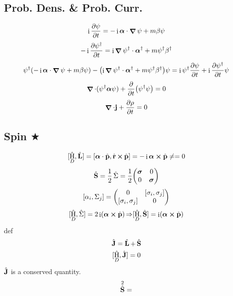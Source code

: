 \documentclass[a4paper]{article}
\DeclareMathOperator{\I}{\mathrm{i}}
\DeclareMathOperator{\dra}{\Rightarrow}
\DeclareMathOperator{\na}{\bm{\nabla}}
\DeclareMathOperator{\hr}{\hat{\vb{r}}}
\DeclareMathOperator{\hH}{\hat{H}}
\DeclareMathOperator{\hL}{\hat{\vb{L}}}
\DeclareMathOperator{\hp}{\hat{\vb{p}}}
\DeclareMathOperator{\hS}{\hat{\vb{S}}}
\DeclareMathOperator{\hSigma}{\hat{\bm\Sigma}}
\DeclareMathOperator{\hJ}{\hat{\vb{J}}}
\numberwithin{equation}{section}
\begin{document}
\subsection{Prob. Dens. \& Prob. Curr.}
\begin{equation}\label{key}
\I\pdv{\psi}{t} = -\I\bm\alpha\cdot\na \psi + m\beta\psi
\end{equation}
\begin{equation}\label{key}
-\I\pdv{\psi^\dagger}{t} = \I\na\psi^\dagger\cdot\bm\alpha^\dagger + m\psi^\dagger\beta^\dagger
\end{equation}
\begin{equation}\label{key}
\psi^\dagger\qty(-\I\bm\alpha\cdot\na \psi + m\beta\psi) - \qty(\I\na\psi^\dagger\cdot\bm\alpha^\dagger + m\psi^\dagger\beta^\dagger)\psi = \I\psi^\dagger\pdv{\psi}{t} + \I\pdv{\psi^\dagger}{t}\psi
\end{equation}
\begin{equation}\label{key}
\na\cdot(\psi^\dagger \bm\alpha \psi) + \pdv{t}(\psi^\dagger \psi) = 0
\end{equation}
\begin{equation}\label{key}
\na\cdot\vb{j} + \pdv{\rho}{t} = 0
\end{equation}

\subsection{Spin $ \bigstar $}
\begin{equation}\label{key}
[\hH_D, \hL] = [\bm\alpha\cdot\hp, \hr\cross\hp] = -\I \bm\alpha\cross\hp \neq = 0 
\end{equation}
\begin{equation}\label{key}
\hS = \dfrac{1}{2}\hSigma = \dfrac{1}{2} \mqty(\bm\sigma & 0\\ 0 & \bm\sigma)
\end{equation}
\begin{equation}\label{key}
[\alpha_i, \Sigma_j] = \mqty(0 & [\sigma_i, \sigma_j]\\ [\sigma_i, \sigma_j] & 0)
\end{equation}
\begin{equation}\label{key}
[\hH_D, \hSigma] = 2\I(\bm\alpha\cross\hp) \dra [\hH_D, \hS] = \I(\bm\alpha\cross\hp)
\end{equation}
def
\begin{equation}\label{key}
\hJ = \hL + \hS
\end{equation}
\begin{equation}\label{key}
[\hH_D, \hJ] = 0
\end{equation}
$ \hJ $ is a conserved quantity.\\
\begin{equation}\label{key}
\hS^2 = 
\end{equation}
\end{document}
